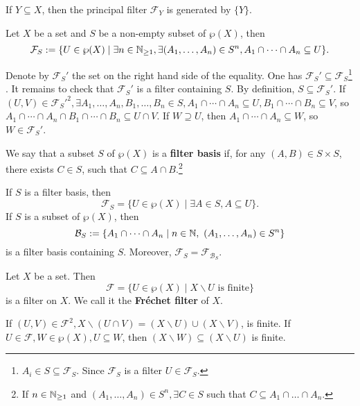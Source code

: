 \begin{remark}
    If $Y\subseteq X$, then the principal filter $\mathcal{ F}_Y$ is generated by $\{Y\}$.
\end{remark}
\begin{propositionenv}
    Let $X$ be a set and $S$ be a non-empty subset of  $\wp(X)$, then 
    $$\mathcal{F}_S:=\{U\in \wp(X)\mid \exists n\in \mathbb{N}_{\ge 1}, \exists(A_1,\dots,A_n)\in S^n, A_1\cap\cdots\cap A_n\subseteq U\}.$$
\end{propositionenv}
\begin{proofenv}
    Denote by $\mathcal{F}_S'$ the set on the right hand side of the equality. One has $\mathcal{F}_S'\subseteq \mathcal{F}_S$\footnote{$A_i\in S\subseteq\mathcal{F}_S$. Since $\mathcal{F}_S$ is a filter $U\in \mathcal{F}_S$.} . It remains to check that $\mathcal{F}_S'$ is a filter containing $S$. By definition, $S\subseteq \mathcal{F}_S'$. If $(U,V)\in \mathcal{ F}_S'^2, \exists A_1,\dots,A_n,B_1,\dots,B_n\in S, A_1\cap\cdots\cap A_n\subseteq U, B_1\cap\cdots\cap B_n\subseteq V$, so $A_1\cap\cdots\cap A_n\cap B_1\cap\cdots\cap B_n\subseteq U\cap V$. If $W\supseteq U$, then $A_1\cap\cdots\cap A_n\subseteq W$, so $W\in \mathcal{F}_S'$.
\end{proofenv}
\begin{definitionenv}
    We say that a subset $S$ of $\wp(X)$ is a \textbf{filter basis} if, for any $(A,B)\in S\times S$, there exists $C\in S$, such that $C\subseteq A\cap B$.\footnote{If $n\in \mathbb{N}_{\ge 1}$ and $(A_1,\dots,A_n)\in S^n,\exists C\in S$ such that $C\subseteq A_1\cap \dots\cap A_n$.}
\end{definitionenv}
\begin{remark}
    If $S$ is a filter basis, then 
    $$\mathcal{F}_S=\{U\in \wp(X)\mid \exists A\in S, A\subseteq U\}.$$
    If $S$ is a subset of $\wp(X)$, then 
    $$\mathcal{B}_S:=\{A_1\cap \cdots \cap A_n\mid n\in \mathbb{N},\ (A_1,\dots,A_n)\in S^n\}$$
     is a filter basis containing $S$. Moreover, $\mathcal{F}_S=\mathcal{F}_{\mathcal{B}_S}$.
\end{remark}
\begin{propositionenv}
    Let $X$ be a set. Then
    $$\mathcal{F}=\{U\in \wp(X)\mid X\backslash U \text{ is finite}\}$$
    is a filter on $X$. We call it the \textbf{Fréchet filter} of $X$.
\end{propositionenv}
\begin{proofenv}
    \quad
    \newline
    If $(U,V)\in \mathcal{F}^2, X\backslash (U\cap V)=(X\backslash U)\cup (X\backslash V)$, is finite.
    \newline
    If $U\in \mathcal{F}, W\in \wp(X), U\subseteq W$, then $(X\backslash W)\subseteq (X\backslash U)$ is finite.
\end{proofenv}
